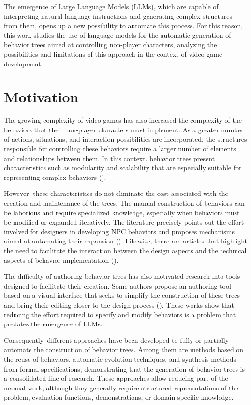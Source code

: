 The emergence of Large Language Models (LLMs), which are capable of interpreting natural language instructions and generating complex structures from them, opens up a new possibility to automate this process.
For this reason, this work studies the use of language models for the automatic generation of behavior trees aimed at controlling non-player characters, analyzing the possibilities and limitations of this approach in the context of video game development.

\section{Motivation}
The growing complexity of video games has also increased the complexity of the behaviors that their non-player characters must implement.
As a greater number of actions, situations, and interaction possibilities are incorporated, the structures responsible for controlling these behaviors require a larger number of elements and relationships between them.
In this context, behavior trees present characteristics such as modularity and scalability that are especially suitable for representing complex behaviors (\cite{DEFCON}).

However, these characteristics do not eliminate the cost associated with the creation and maintenance of the trees.
The manual construction of behaviors can be laborious and require specialized knowledge, especially when behaviors must be modified or expanded iteratively.
The literature precisely points out the effort involved for designers in developing NPC behaviors and proposes mechanisms aimed at automating their expansion (\cite{CBR}).
Likewise, there are articles that highlight the need to facilitate the interaction between the design aspects and the technical aspects of behavior implementation (\cite{BTValRef}).

The difficulty of authoring behavior trees has also motivated research into tools designed to facilitate their creation.
Some authors propose an authoring tool based on a visual interface that seeks to simplify the construction of these trees and bring their editing closer to the design process (\cite{AIPaint}).
These works show that reducing the effort required to specify and modify behaviors is a problem that predates the emergence of LLMs.

Consequently, different approaches have been developed to fully or partially automate the construction of behavior trees.
Among them are methods based on the reuse of behaviors, automatic evolution techniques, and synthesis methods from formal specifications, demonstrating that the generation of behavior trees is a consolidated line of research.
These approaches allow reducing part of the manual work, although they generally require structured representations of the problem, evaluation functions, demonstrations, or domain-specific knowledge.

